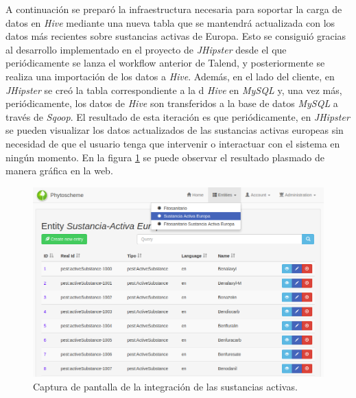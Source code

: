 \par
A continuación se preparó la infraestructura necesaria para soportar la carga de datos en \textit{Hive} mediante una nueva tabla que se mantendrá actualizada con los datos más recientes sobre sustancias activas de Europa. Esto se consiguió gracias al desarrollo implementado en el proyecto de \textit{JHipster} desde el que periódicamente se lanza el workflow anterior de Talend, y posteriormente se realiza una importación de los datos a \textit{Hive}. Además, en el lado del cliente, en \textit{JHipster} se creó la tabla correspondiente a la d \textit{Hive} en \textit{MySQL} y, una vez más, periódicamente, los datos de \textit{Hive} son transferidos a la base de datos \textit{MySQL} a través de \textit{Sqoop}. El resultado de esta iteración es que periódicamente, en \textit{JHipster} se pueden visualizar los datos actualizados de las sustancias activas europeas sin necesidad de que el usuario tenga que intervenir o interactuar con el sistema en ningún momento. En la figura \ref{fig:capturaSustActivas} se puede observar el resultado plasmado de manera gráfica en la web. 
\begin{figure}[!h]
    \centering
    \includegraphics[width=\textwidth,height=\textheight,keepaspectratio]{Imagenes/capturaSustActivas}
    \caption{Captura de pantalla de la integración de las sustancias activas.}
    \label{fig:capturaSustActivas}
\end{figure}
\bigskip

